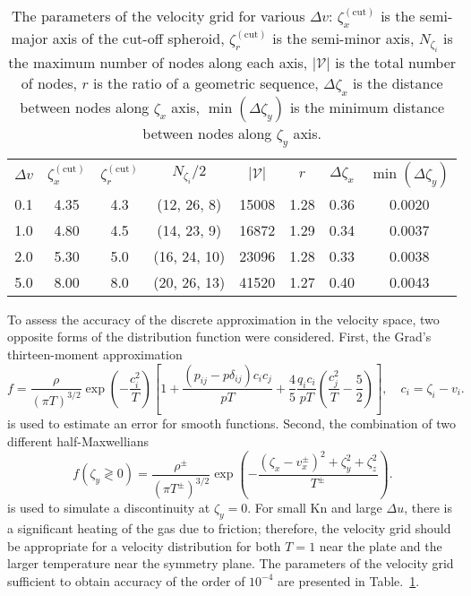 \documentclass[review]{elsarticle}
\newcommand{\Kn}{\mathrm{Kn}}
\begin{document}
\begin{table}
    \centering
    \begin{tabular}{cccccccc}
        \(\Delta{v}\) & \(\zeta^{(\mathrm{cut})}_x\) & \(\zeta^{(\mathrm{cut})}_r\)
            & \(N_{\zeta_i}/2\) & \(|\mathcal{V}|\) & \(r\) & \(\Delta\zeta_x\) & \(\min(\Delta\zeta_y)\) \\[3pt]
        0.1 & 4.35 & 4.3 & (12, 26, 8)  & 15008 & 1.28 & 0.36 & 0.0020 \\
        1.0 & 4.80 & 4.5 & (14, 23, 9)  & 16872 & 1.29 & 0.34 & 0.0037 \\
        2.0 & 5.30 & 5.0 & (16, 24, 10) & 23096 & 1.28 & 0.33 & 0.0038 \\
        5.0 & 8.00 & 8.0 & (20, 26, 13) & 41520 & 1.27 & 0.40 & 0.0043 \\
    \end{tabular}
    \caption{The parameters of the velocity grid for various \(\Delta{v}\):
        \(\zeta^{(\mathrm{cut})}_x\) is the semi-major axis of the cut-off spheroid,
        \(\zeta^{(\mathrm{cut})}_r\) is the semi-minor axis,
        \(N_{\zeta_i}\) is the maximum number of nodes along each axis,
        \(|\mathcal{V}|\) is the total number of nodes,
        \(r\) is the ratio of a geometric sequence,
        \(\Delta\zeta_x\) is the distance between nodes along \(\zeta_x\) axis,
        \(\min(\Delta\zeta_y)\) is the minimum distance between nodes along \(\zeta_y\) axis.}
    \label{table:velocity_grid}
\end{table}

To assess the accuracy of the discrete approximation in the velocity space,
two opposite forms of the distribution function were considered.
First, the Grad's thirteen-moment approximation
\begin{equation}\label{eq:grad13}
    f = \frac{\rho}{(\pi T)^{3/2}}\exp\left(-\frac{c_i^2}{ T}\right)
    \left[ 1 + \frac{(p_{ij}-p\delta_{ij})c_ic_j}{pT} + \frac4{5}\frac{q_ic_i}{pT}\left(\frac{c_j^2}{T}-\frac5{2}\right) \right],
    \quad c_i = \zeta_i - v_i.
\end{equation}
is used to estimate an error for smooth functions.
Second, the combination of two different half-Maxwellians
\begin{equation}\label{eq:double_Maxwell}
    f(\zeta_y\gtrless0) = \frac{\rho^\pm}{(\pi T^\pm)^{3/2}}\exp\left(-\frac{(\zeta_x-v_x^\pm)^2+\zeta_y^2+\zeta_z^2}{T^\pm}\right).
\end{equation}
is used to simulate a discontinuity at \(\zeta_y=0\).
For small \(\Kn\) and large \(\Delta{u}\), there is a significant heating of the gas due to friction;
therefore, the velocity grid should be appropriate for a velocity distribution
for both \(T=1\) near the plate and the larger temperature near the symmetry plane.
The parameters of the velocity grid sufficient to obtain accuracy of the order of \(10^{-4}\)
are presented in Table.~\ref{table:velocity_grid}.
\end{document}
